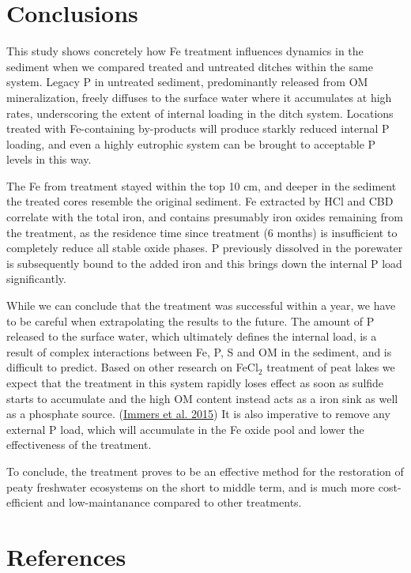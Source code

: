 \documentclass[a4paper,11pt]{article}
\begin{document}
\hypertarget{conclusions}{%
\section{Conclusions}\label{conclusions}}

This study shows concretely how Fe treatment influences dynamics in the sediment when we compared treated and untreated ditches within the same system. Legacy P in untreated sediment, predominantly released from OM mineralization, freely diffuses to the surface water where it accumulates at high rates, underscoring the extent of internal loading in the ditch system. Locations treated with Fe-containing by-products will produce starkly reduced internal P loading, and even a highly eutrophic system can be brought to acceptable P levels in this way.

The Fe from treatment stayed within the top 10 cm, and deeper in the sediment the treated cores resemble the original sediment. Fe extracted by HCl and CBD correlate with the total iron, and contains presumably iron oxides remaining from the treatment, as the residence time since treatment (6 months) is insufficient to completely reduce all stable oxide phases. P previously dissolved in the porewater is subsequently bound to the added iron and this brings down the internal P load significantly.

While we can conclude that the treatment was successful within a year, we have to be careful when extrapolating the results to the future. The amount of P released to the surface water, which ultimately defines the internal load, is a result of complex interactions between Fe, P, S and OM in the sediment, and is difficult to predict. Based on other research on FeCl\(_2\) treatment of peat lakes we expect that the treatment in this system rapidly loses effect as soon as sulfide starts to accumulate and the high OM content instead acts as a iron sink as well as a phosphate source. (\protect\hyperlink{ref-immersFightingInternalPhosphorus2015}{Immers et al. 2015}) It is also imperative to remove any external P load, which will accumulate in the Fe oxide pool and lower the effectiveness of the treatment.

To conclude, the treatment proves to be an effective method for the restoration of peaty freshwater ecosystems on the short to middle term, and is much more cost-efficient and low-maintanance compared to other treatments.

\newpage

\hypertarget{references}{%
\section*{References}\label{references}}
\end{document}
